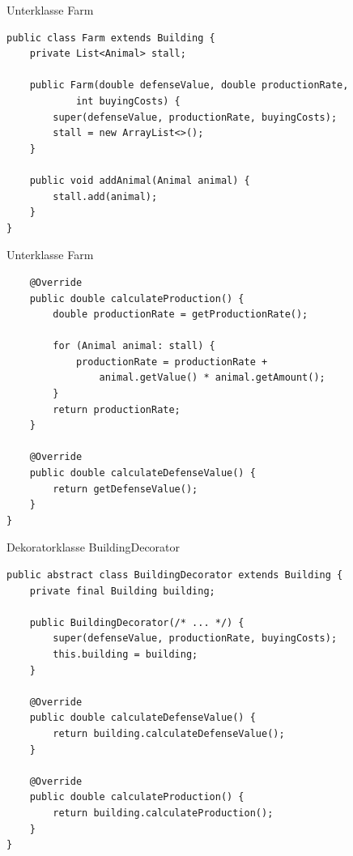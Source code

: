 \begin{frame}[fragile]{Unterklasse Farm}
	\begin{exampleblock}{}
        \begin{lstlisting}
public class Farm extends Building {
	private List<Animal> stall;
	
	public Farm(double defenseValue, double productionRate, 
            int buyingCosts) {
		super(defenseValue, productionRate, buyingCosts);
		stall = new ArrayList<>();
	}

	public void addAnimal(Animal animal) {
		stall.add(animal);
	}
}
        \end{lstlisting}
	\end{exampleblock}
\end{frame}

\begin{frame}[fragile]{Unterklasse Farm}
	\begin{exampleblock}{}
        \begin{lstlisting}
	@Override
	public double calculateProduction() {
		double productionRate = getProductionRate();
		
		for (Animal animal: stall) {
			productionRate = productionRate + 
                animal.getValue() * animal.getAmount();
		}
		return productionRate;
	}
	
	@Override
	public double calculateDefenseValue() {
		return getDefenseValue();
	}
}
        \end{lstlisting}
	\end{exampleblock}
\end{frame}

\begin{frame}[fragile]{Dekoratorklasse BuildingDecorator}
	\begin{exampleblock}{}
        \begin{lstlisting}
public abstract class BuildingDecorator extends Building {
	private final Building building;
	
	public BuildingDecorator(/* ... */) {
		super(defenseValue, productionRate, buyingCosts);
		this.building = building;
	}
	
	@Override
	public double calculateDefenseValue() {
		return building.calculateDefenseValue();
	}
	
	@Override
	public double calculateProduction() {
		return building.calculateProduction();
	}
}
        \end{lstlisting}
	\end{exampleblock}
\end{frame}

